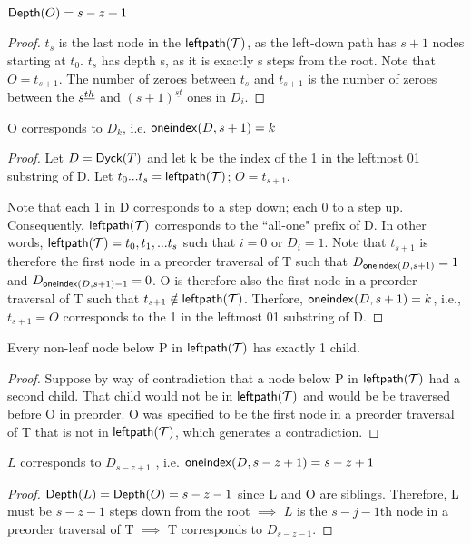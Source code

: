 \begin{remark} $\mathsf{Depth}{(O)}=s-z+1$ \label{re:o_depth_formula}
\end{remark} 
\begin{proof}


    $t_s$ is the last node in the $\mathsf{leftpath}{(\mathcal{T})}$, as the left-down path has $s+1$ nodes starting at $t_0$. $t_s$ has depth s, as it is exactly s steps from the root.  Note that $O=t_{s+1}$.  The number of zeroes between $t_s$ and $t_{s+1}$ is the number of zeroes between the $s^{\underline{th}}$ and $(s+1)^{\underline{st}}$ ones in $D_i$.  

\end{proof} 
\begin{remark}O corresponds to $D_k$, i.e. $\mathsf{oneindex}({D}, s+1)=k$
\end{remark}
\begin{proof}
    Let $D=\mathsf{Dyck}{(T)}$ and let k be the index of the 1 in the leftmost 01 substring of D.  Let $t_0...t_s=\mathsf{leftpath}{(\mathcal{T})}$; $O=t_{s+1}$.


    Note that each 1 in D corresponds to a step down; each 0 to a step up.  Consequently, $\mathsf{leftpath}{(\mathcal{T})}$ corresponds to the ``all-one" prefix of D.  In other words, $\mathsf{leftpath}{(\mathcal{T})}=t_0,t_1,...t_{s}$ such that $i=0$ or $D_i=1$. Note that $t_{s+1}$ is therefore the first node in a preorder traversal of T such that $D_{\mathsf{oneindex}({D}, s+1)}=1$ and $D_{\mathsf{oneindex}({D}, s+1)-1}=0$.  O is therefore also the first node in a preorder traversal of T such that $t_{s+1} \notin \mathsf{leftpath}{(\mathcal{T})}$.  Therfore, $\mathsf{oneindex}({D}, s+1)=k$, i.e., $t_{s+1}=O$ corresponds to the 1 in the leftmost 01 substring of D.

\end{proof}
\begin{remark} Every non-leaf node below P in $\mathsf{leftpath}{(\mathcal{T})}$ has exactly 1 child.  \label{rem:left-is-path}
\end{remark}

\begin{proof}
    Suppose by way of contradiction that a node below P in $\mathsf{leftpath}{(\mathcal{T})}$ had a second child. That child would not be in $\mathsf{leftpath}{(\mathcal{T})}$ and would be be traversed before O in preorder. O was specified to be the first node in a preorder traversal of T that is not in $\mathsf{leftpath}{(\mathcal{T})}$, which generates a contradiction.

\end{proof}

\begin{remark} \label{re:L_sz1}
    $L$ corresponds to $D_{s-z+1}$ , i.e. $\mathsf{oneindex}({D}, s-z+1)=s-z+1$
\end{remark}
\begin{proof}

    $\mathsf{Depth}{(L)}=\mathsf{Depth}{(O)}=s-z-1$ since L and O are siblings. Therefore, L must be $s-z-1$ steps down from the root $\implies$ $L$ is the $s-j-1$th node in a preorder traversal of T $\implies$ T corresponds to $D_{s-z-1}$.


\end{proof}


